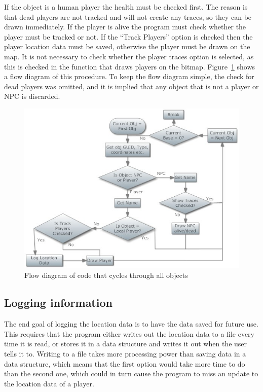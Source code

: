 If the object is a human player the health must be checked first. The reason is that dead players are not tracked and will not create any traces, so they can be drawn immediately. If the player is alive the program must check whether the player must be tracked or not. If the ``Track Players'' option is checked then the player location data must be saved, otherwise the player must be drawn on the map. It is not necessary to check whether the player traces option is selected, as this is checked in the function that draws players on the bitmap. Figure~\ref{objects} shows a flow diagram of this procedure. To keep the flow diagram simple, the check for dead players was omitted, and it is implied that any object that is not a player or NPC is discarded.


\begin{figure}[htbp]  %
\centering
\includegraphics[scale = 0.65]{objects.jpg}	
\caption{Flow diagram of code that cycles through all objects}
\label{objects}
\end{figure}


\subsection{Logging information}
The end goal of logging the location data is to have the data saved for future use. This requires that the program either writes out the location data to a file every time it is read, or stores it in a data structure and writes it out when the user tells it to. Writing to a file takes more processing power than saving data in a data structure, which means that the first option would take more time to do than the second one, which could in turn cause the program to miss an update to the location data of a player.

